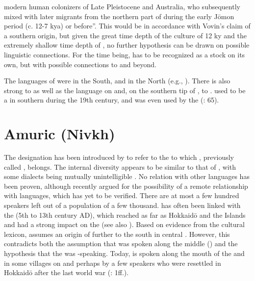 modern human colonizers of Late Pleistocene  and Australia, who subsequently mixed with later migrants from the northern part of  during the early J\=omon period (c. 12-7 kya) or before”. This would be in accordance with Vovin’s claim of a southern origin, but given the great time depth of the  culture of 12 ky and the extremely shallow time depth of , no further hypothesis can be drawn on possible linguistic connections. For the time being,  has to be recognized as a stock on its own, but with possible connections to  and beyond.

The  languages of  were  in the South, and  in the North (e.g., \citealt{Vovin2016}). There is also strong  to  as well as the  language  on  and, on the southern tip of , to .  used to be a  in southern  during the 19th century, and was even used by the  (\citealt{Yamada2010}: 65).

\section{Amuric (Nivkh)}\label{sec:2.2}

The designation  has been introduced by \citet{Janhunen1996} to refer to the  to which , previously called , belongs. The internal diversity appears to be similar to that of , with some dialects being mutually unintelligible \citep[7]{Gruzdeva1998}. No relation with other languages has been proven, although \citet{Fortescue2011} recently argued for the possibility of a remote relationship with  languages, which has yet to be verified. There are at most a few hundred speakers left out of a population of a few thousand.  has often been linked with the  (5th to 13th century AD), which reached as far as Hokkaid\=o and the  Islands \citep{Fortescue2011} and had a strong impact on the  (see also \citealt{Vovin2016}). Based on evidence from the cultural lexicon, \citet[294]{Janhunen2010} assumes an origin of  further to the south in central . However, this contradicts both the assumption that  was spoken along the middle  () and the hypothesis that the  was -speaking. Today,  is spoken along the mouth of the  and in some villages on  and perhaps by a few speakers who were resettled in Hokkaid\=o after the last world war (\citealt{Fortescue2016}: 1ff.).


